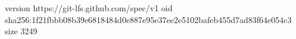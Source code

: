 version https://git-lfs.github.com/spec/v1
oid sha256:1f21fbbb08b39e6818484d0e887e95e37ee2e5102bafeb455d7ad83f64e054c3
size 3249
